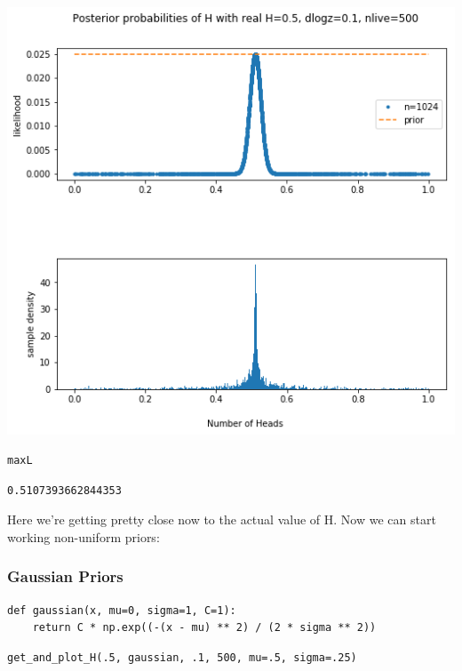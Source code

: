 \documentclass[11pt]{article}
\begin{document}
\begin{itemize}
\includegraphics[width=.9\linewidth]{./obipy-resources/692gDn.png}

\begin{verbatim}
maxL
\end{verbatim}

\begin{verbatim}
0.5107393662844353
\end{verbatim}

Here we're getting pretty close now to the actual value of H.
Now we can start working non-uniform priors:
\end{itemize}

\subsubsection*{Gaussian Priors}
\label{sec-1-3-2}

\begin{verbatim}
def gaussian(x, mu=0, sigma=1, C=1):
    return C * np.exp((-(x - mu) ** 2) / (2 * sigma ** 2))
\end{verbatim}


\begin{verbatim}
get_and_plot_H(.5, gaussian, .1, 500, mu=.5, sigma=.25)
\end{verbatim}
\end{document}
